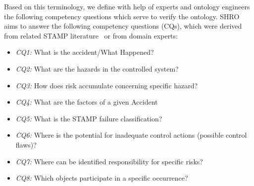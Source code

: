 \documentclass[sw]{iosart2x}
\newcommand{\CONSIDER}[1]{{\color{blue}{\textbf{CONSIDER: {#1}}\xspace}}}
\newcommand{\COMMENT}[1]{\hl{ \textnormal{#1}}}
\newcommand{\COMMENT}[2]{\hl{ \textnormal{#1} \textbf{comment:} \textit{#2}}\xspace}
\begin{document}
Based on this terminology, we define with help of experts and ontology engineers the following competency questions which serve to verify the ontology. SHRO aims to answer the following competency questions (CQs), which were derived from related STAMP literature~\cite{leveson2012engineering, Leveson2004} or from domain experts:  
\begin{itemize}
\item \emph{CQ1:} What is the accident/What Happened?
   \item \emph{CQ2:} What are the hazards in the controlled system?
    \item \emph{CQ3:} How does risk accumulate concerning specific hazard?
    \item \emph{CQ4:}
    What are the factors of a given Accident
   
    \item \emph{CQ5:} What is the STAMP failure classification?
    \item \emph{CQ6:} Where is the potential for inadequate control actions (possible control flaws)?
    
   
   
      \item \emph{CQ7:} Where can be identified responsibility for specific risks?
    \item \emph{CQ8:} Which objects participate in a specific occurrence?
    
\end{itemize}
\end{document}
